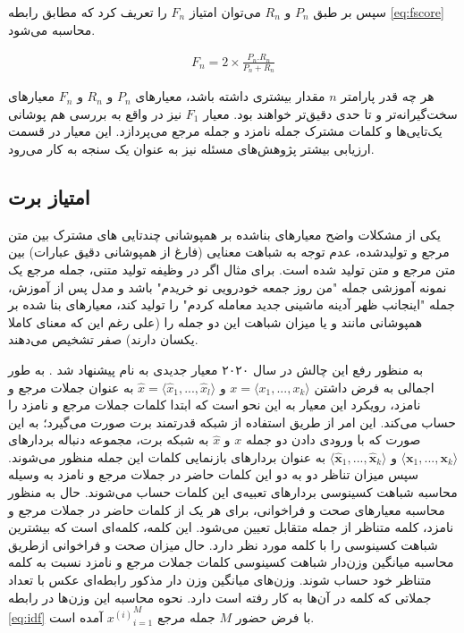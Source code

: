سپس بر طبق 
$P_n$
و
$R_n$
می‌توان امتیاز 
$F_n$
را تعریف کرد که مطابق رابطه
\ref{eq:fscore}
 محاسبه می‌شود.

\begin{align}\label{eq:fscore}
F_n=2\times \frac{P_n.R_n}{P_n+R_n}
\end{align}

هر چه قدر پارامتر 
$n$
مقدار بیشتری داشته باشد، معیارهای 
$P_n$
و
$R_n$
و
$F_n$
معیارهای سخت‌گیرانه‌تر و تا حدی دقیق‌تر خواهند بود. معیار
$F_1$
نیز در واقع به بررسی هم پوشانی یک‌تایی‌ها و کلمات مشترک جمله نامزد و جمله مرجع می‌پردازد. این معیار در قسمت ارزیابی بیشتر پژوهش‌های مسئله نیز به عنوان یک سنجه به کار می‌رود. 


\subsection{امتیاز برت}

یکی از مشکلات واضح معیارهای بناشده بر همپوشانی چندتایی های مشترک بین متن مرجع و تولید‌شده،‌ عدم توجه به شباهت‌ معنایی (فارغ از همپوشانی دقیق عبارات) بین متن مرجع و متن تولید شده است. برای مثال اگر در وظیفه تولید متنی، جمله مرجع یک نمونه آموزشی جمله "من روز جمعه خودرویی نو خریدم" باشد و مدل پس از آموزش، جمله "اینجانب ظهر آدینه ماشینی جدید معامله کردم" را تولید کند، معیارهای بنا شده بر همپوشانی مانند
و یا
میزان شباهت این دو جمله را (علی رغم این که معنای کاملا یکسان دارند) صفر تشخیص می‌دهند. 

به منظور رفع این چالش در سال ۲۰۲۰ معیار جدیدی به نام 
پیشنهاد شد
\cite{bertscore_paper}.
به طور اجمالی به فرض داشتن
$x =  \langle x_1, ..., x_k\rangle$
و 
$\hat{x} = \langle \hat{x}_1, ..., \hat{x}_l \rangle$
به عنوان جملات مرجع و نامزد، رویکرد این معیار به این نحو است که ابتدا 
کلمات جملات مرجع و نامزد را حساب می‌کند. 
این امر از طریق استفاده از شبکه قدرتمند برت صورت می‌گیرد؛ به این صورت که با ورودی دادن دو جمله 
$x$
و 
$\hat{x}$
به شبکه برت، مجموعه دنباله بردارهای 
$ \langle \mathbf{x}_1, ..., \mathbf{x}_k\rangle $
و
$ \langle \mathbf{\hat{x}}_1, ..., \mathbf{\hat{x}}_k\rangle $
به عنوان بردارهای بازنمایی کلمات این جمله منظور می‌شوند.
سپس میزان تناظر دو به دو این کلمات حاضر در جملات مرجع و نامزد به وسیله محاسبه شباهت کسینوسی بردارهای تعبیه‌ی این کلمات حساب می‌شوند. حال به منظور محاسبه معیارهای صحت و فراخوانی، برای هر یک از کلمات حاضر در جملات مرجع و نامزد، کلمه متناظر از جمله متقابل تعیین می‌شود. این کلمه، کلمه‌ای است که بیشترین شباهت کسینوسی را با کلمه مورد نظر دارد. حال میزان صحت و فراخوانی ازطریق محاسبه میانگین وزن‌دار شباهت کسینوسی کلمات جملات مرجع و نامزد نسبت به کلمه متناظر خود حساب شوند. وزن‌های میانگین وزن دار مذکور رابطه‌ای عکس با تعداد جملاتی که کلمه در آن‌ها به کار رفته است دارد. نحوه محاسبه این وزن‌ها در رابطه 
\ref{eq:idf}
با فرض حضور 
$M$
جمله مرجع 
${x^(i)}^{M}_{i=1}$
آمده است.

